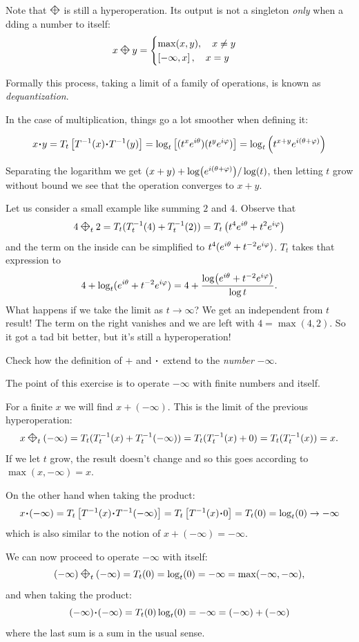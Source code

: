 \documentclass[12pt]{memoir}
\newcommand{\diamondplus}{\mathbin{\rotatebox[origin=c]{45}{$\boxtimes$}}} %
\begin{document}
\begin{Rmk}
Note that $\diamondplus$ is still a hyperoperation. Its output is not a singleton \emph{only} when a dding a number to itself:
$$x\diamondplus y=\begin{cases}
    \max(x,y),\quad x\neq y\\
    \bonj{-\infty,x},\quad x=y
\end{cases}$$
\end{Rmk}

Formally this process, taking a limit of a family of operations, is known as \emph{dequantization}.\par

In the case of multiplication, things go a lot smoother when defining it:

$$x\.y =T_t\bonj{T^{-1}(x)\.T^{-1}(y)}=\log_t\bonj{(t^xe^{i\te})(t^ye^{i\vf})}=\log_t\left(t^{x+y}e^{i(\te+\vf)}\right)$$

Separating the logarithm we get $(x+y)+\log(e^{i(\theta+\varphi)})/\log(t)$, then letting $t$ grow without bound we see that the operation converges to $x+y$. 

\begin{Ex}
    Let us consider a small example like summing $2$ and $4$. Observe that 
    $$4\diamondplus_t 2=T_t(T_t^{-1}(4)+T_t^{-1}(2))=T_t\left(t^4e^{i\te}+t^2e^{i\vf}\right)$$
    and the term on the inside can be simplified to $t^{4}(e^{i\theta}+t^{-2}e^{i\varphi})$. $T_t$ takes that expression to
    $$4+\log_t(e^{i\theta}+t^{-2}e^{i\varphi})=4+\frac{\log(e^{i\theta}+t^{-2}e^{i\varphi})}{\log t}.$$
    What happens if we take the limit as $t\to\infty$? We get an independent from $t$ result! 
    The term on the right vanishes and we are left with $4=\max(4,2)$. So it got a tad bit better, but it's still a hyperoperation!
\end{Ex}

\begin{Ej}
Check how the definition of $+$ and $\.$ extend to the \emph{number} $-\infty$.
\end{Ej}

\begin{ptcb}
The point of this exercise is to operate $-\infty$ with finite numbers and itself.\par
For a finite $x$ we will find $x+(-\infty)$. This is the limit of the previous hyperoperation:
$$x\diamondplus_t(-\infty)=T_t(T_t^{-1}(x)+T_t^{-1}(-\infty))=T_t(T_t^{-1}(x)+0)=T_t(T_t^{-1}(x))=x.$$
If we let $t$ grow, the result doesn't change and so this goes according to $\max(x,-\infty)=x$.\par 
On the other hand when taking the product:
$$x\.(-\infty)=T_t\bonj{T^{-1}(x)\.T^{-1}(-\infty)}=T_t\bonj{T^{-1}(x)\.0}=T_t(0)=\log_t(0)\to-\infty$$
which is also similar to the notion of $x+(-\infty)=-\infty$.\par 
We can now proceed to operate $-\infty$ with itself:
$$(-\infty)\diamondplus_t(-\infty)=T_t(0)=\log_t(0)=-\infty=\max(-\infty,-\infty),$$
and when taking the product:
$$(-\infty)\.(-\infty)=T_t(0)\log_t(0)=-\infty=(-\infty)+(-\infty)$$
where the last sum is a sum in the usual sense.
\end{ptcb}
\end{document}
